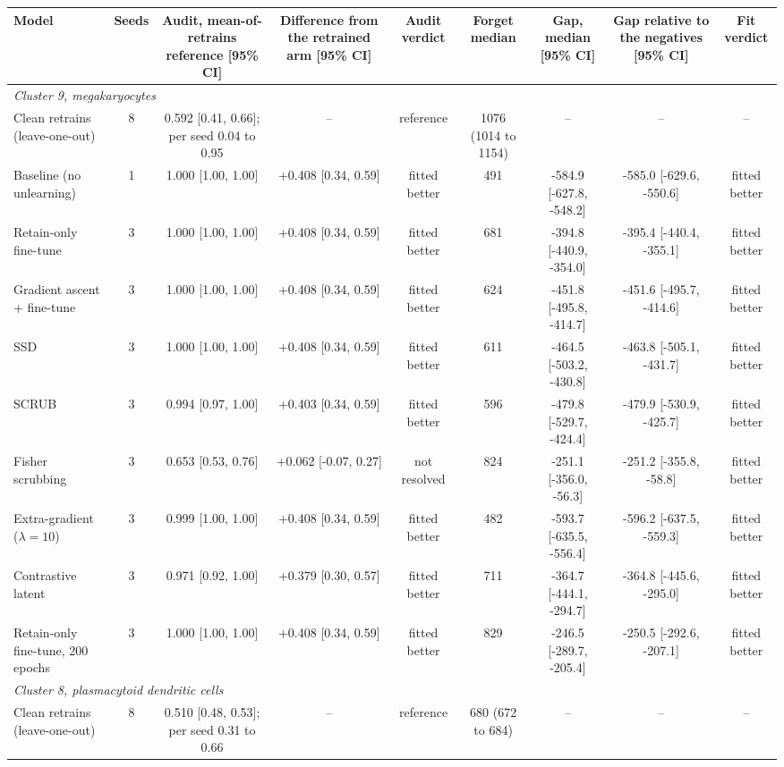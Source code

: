 \begin{tabular}{lcccccccc}
\toprule
Model & Seeds & Audit, mean-of-retrains reference [95\% CI] & Difference from the retrained arm [95\% CI] & Audit verdict & Forget median & Gap, median [95\% CI] & Gap relative to the negatives [95\% CI] & Fit verdict \\
\midrule
\multicolumn{9}{l}{\emph{Cluster 9, megakaryocytes}} \\
Clean retrains (leave-one-out) & 8 & 0.592 [0.41, 0.66]; per seed 0.04 to 0.95 & -- & reference & 1076 (1014 to 1154) & -- & -- & -- \\
Baseline (no unlearning) & 1 & 1.000 [1.00, 1.00] & +0.408 [0.34, 0.59] & fitted better & 491 & -584.9 [-627.8, -548.2] & -585.0 [-629.6, -550.6] & fitted better \\
Retain-only fine-tune & 3 & 1.000 [1.00, 1.00] & +0.408 [0.34, 0.59] & fitted better & 681 & -394.8 [-440.9, -354.0] & -395.4 [-440.4, -355.1] & fitted better \\
Gradient ascent + fine-tune & 3 & 1.000 [1.00, 1.00] & +0.408 [0.34, 0.59] & fitted better & 624 & -451.8 [-495.8, -414.7] & -451.6 [-495.7, -414.6] & fitted better \\
SSD & 3 & 1.000 [1.00, 1.00] & +0.408 [0.34, 0.59] & fitted better & 611 & -464.5 [-503.2, -430.8] & -463.8 [-505.1, -431.7] & fitted better \\
SCRUB & 3 & 0.994 [0.97, 1.00] & +0.403 [0.34, 0.59] & fitted better & 596 & -479.8 [-529.7, -424.4] & -479.9 [-530.9, -425.7] & fitted better \\
Fisher scrubbing & 3 & 0.653 [0.53, 0.76] & +0.062 [-0.07, 0.27] & not resolved & 824 & -251.1 [-356.0, -56.3] & -251.2 [-355.8, -58.8] & fitted better \\
Extra-gradient ($\lambda=10$) & 3 & 0.999 [1.00, 1.00] & +0.408 [0.34, 0.59] & fitted better & 482 & -593.7 [-635.5, -556.4] & -596.2 [-637.5, -559.3] & fitted better \\
Contrastive latent & 3 & 0.971 [0.92, 1.00] & +0.379 [0.30, 0.57] & fitted better & 711 & -364.7 [-444.1, -294.7] & -364.8 [-445.6, -295.0] & fitted better \\
Retain-only fine-tune, 200 epochs & 3 & 1.000 [1.00, 1.00] & +0.408 [0.34, 0.59] & fitted better & 829 & -246.5 [-289.7, -205.4] & -250.5 [-292.6, -207.1] & fitted better \\
\midrule
\multicolumn{9}{l}{\emph{Cluster 8, plasmacytoid dendritic cells}} \\
Clean retrains (leave-one-out) & 8 & 0.510 [0.48, 0.53]; per seed 0.31 to 0.66 & -- & reference & 680 (672 to 684) & -- & -- & -- \\

\end{tabular}
